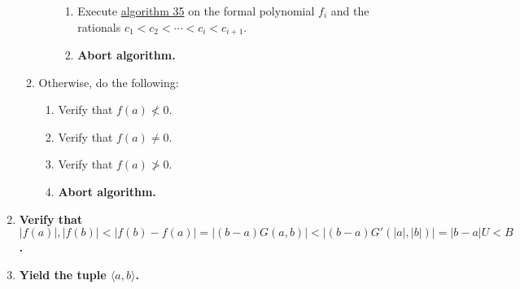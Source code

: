 \documentclass[twocolumn]{article}
\begin{document}
\begin{enumerate}
\begin{enumerate}
\begin{enumerate}
\begin{enumerate}
							\item Execute \hyperref[sec:algorithm 35]{algorithm 35} on the formal polynomial $f_i$ and the rationals $c_1<c_2<\cdots<c_i<c_{i+1}$.
							\item \textbf{Abort algorithm.}
						\end{enumerate}
					\end{enumerate}
					\item Otherwise, do the following:
					\begin{enumerate}
						\item Verify that $f(a)\nless 0$.
						\item Verify that $f(a)\ne 0$.
						\item Verify that $f(a)\ngtr 0$.
						\item \textbf{Abort algorithm.}
					\end{enumerate}
				\end{enumerate}
				\item \textbf{Verify that $\lvert f(a)\rvert,\lvert f(b)\rvert<\lvert f(b)-f(a)\rvert=\lvert(b-a)G(a,b)\rvert<\lvert(b-a)G'(\lvert a\rvert,\lvert b\rvert)\rvert=\lvert b-a\rvert U<B$.}
				\item \textbf{Yield the tuple $\langle a,b\rangle$.}
			\end{enumerate}
\end{document}
